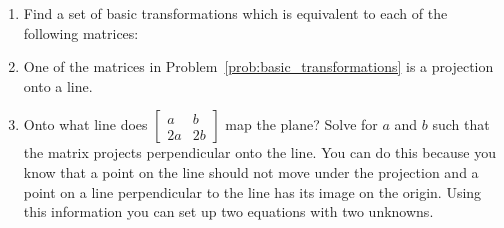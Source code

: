 \documentclass[../gatm.tex]{subfiles}
\begin{document}
\begin{enumerate}
\begin{enumerate}
\item Identify what matrices i through v each do.
\end{enumerate}
Next, we undo this sequence of operations by working backwards:
\vspace{-1em}
$$\mathop{\twomat{1}{0}{0}{-1}}^{\text{i}}
\mathop{\twomat{\frac{3}{\sqrt{13}}}{\frac{2}{\sqrt{13}}}{-\frac{2}{\sqrt{13}}}{\frac{3}{\sqrt{13}}}}^{\text{ii}}
\mathop{\twomat{\sqrt{13}}{0}{0}{\sqrt{13}}}^{\text{iii}}
\mathop{\twomat{1}{\frac{2}{23}}{0}{1}}^{\text{iv}}
\mathop{\twomat{1}{0}{0}{\frac{23}{13}}}^{\text{v}}
\twomat{1}{0}{0}{1}=\twomat{3}{4}{2}{-5}.$$
\begin{enumerate}
\setcounter{enumii}{1}
\item Explain what happens at each matrix, i through v.
\end{enumerate}
\item Find a set of basic transformations which is equivalent to each of the following matrices:\label{prob:basic_transformations}
\begin{enumerate}
\end{enumerate}
\item One of the matrices in Problem~\ref{prob:basic_transformations} is a projection onto a line.
\begin{enumerate}
\end{enumerate}
\item Onto what line does $\left[\begin{array}{cc} a & b \\ 2a & 2b\end{array}\right]$ map the plane? Solve for $a$ and $b$ such that the matrix projects perpendicular onto the line. You can do this because you know that a point on the line should not move under the projection and a point on a line perpendicular to the line has its image on the origin. Using this information you can set up two equations with two unknowns. \label{prob:project_the_plane}

\end{enumerate}
\end{document}

